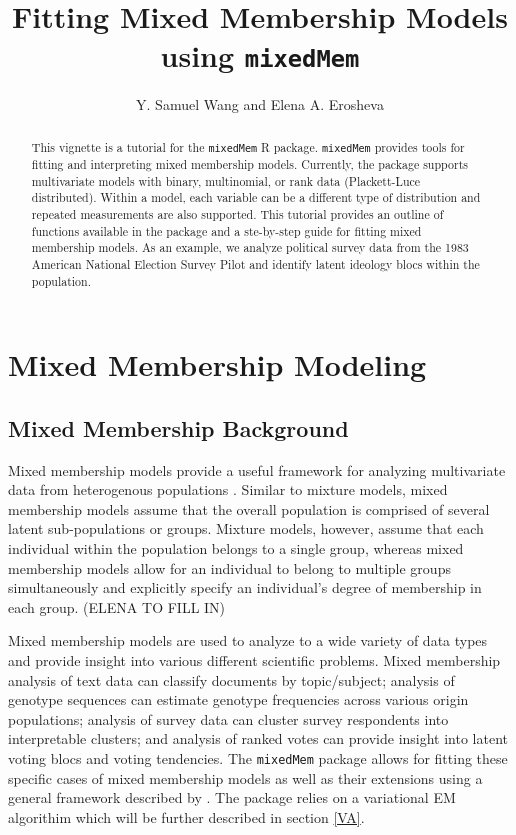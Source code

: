 \documentclass{article}\usepackage[]{graphicx}\usepackage[]{color}
\begin{document}
\title{Fitting Mixed Membership Models using \texttt{mixedMem}}
\author{Y. Samuel Wang and Elena A. Erosheva}
\maketitle

\small
\begin{abstract}
This vignette is a tutorial for the \texttt{mixedMem} R package. \texttt{mixedMem} provides tools for fitting and interpreting mixed membership models. Currently, the package supports multivariate models with binary, multinomial, or rank data (Plackett-Luce distributed). Within a model, each variable can be a different type of distribution and repeated measurements are also supported. This tutorial provides an outline of functions available in the package and a ste-by-step guide for fitting mixed membership models. As an example, we analyze political survey data from the 1983 American National Election Survey Pilot and identify latent ideology blocs within the population.  
\end{abstract}

\normalsize
\section{Mixed Membership Modeling}
\subsection{Mixed Membership Background}
Mixed membership models provide a useful framework for analyzing multivariate data from heterogenous populations \citep{Airoldi2014Handbook}. Similar to mixture models, mixed membership models assume that the overall population is comprised of several latent sub-populations or groups. Mixture models, however, assume that each individual within the population belongs to a single group, whereas mixed membership models allow for an individual to belong to multiple groups simultaneously and explicitly specify an individual's degree of membership in each group. (ELENA TO FILL IN)

Mixed membership models are used to analyze to a wide variety of data types and provide insight into various different scientific problems. Mixed membership analysis of text data \citep{LDA, erosheva2004mixed} can classify documents by topic/subject; analysis of genotype sequences \citep{pritchard2000inference} can estimate genotype frequencies across various origin populations; analysis of survey data \citep{erosheva2007describing, gross2012mixed} can cluster survey respondents into interpretable clusters; and analysis of ranked votes \citep{gormley2009grade} can provide insight into latent voting blocs and voting tendencies. The \texttt{mixedMem} package allows for fitting these specific cases of mixed membership models as well as their extensions using a general framework described by \cite{erosheva2004mixed}. The package relies on a variational EM algorithim which will be further described in section \ref{VA}.
\end{document}
